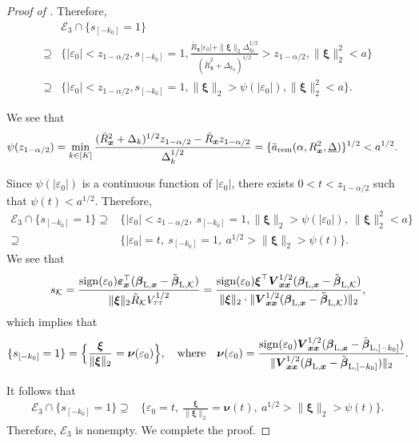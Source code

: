 \documentclass[12pt]{article}
\newcommand{\Lin}{\textnormal{L}}
\newcommand{\mk}{\mathcal{K}}
\newcommand{\rem}{\textnormal{rem}}
\newcommand{\bs}{\boldsymbol}
\begin{document}
\begin{proof}[Proof of ]
Therefore,
\begin{align*}
    & \mathcal{E}_3 \cap \{s_{[-k_0]}=1\} \\
   \supseteq &  \Big\{|\varepsilon_0| < z_{1-\alpha/2},s_{ [-k_0]}=1,\frac{\bar{R}_{\bs{x}}|\varepsilon_0|+\|\bs{\xi}\|_2 \Delta_{k_0}^{1/2} }{(\bar{R}_{\bs{x}}^2 + \Delta_{k_0})^{1/2}} > z_{1-\alpha/2}, \|\bs{\xi}\|_2^2 < a \Big\}\\
   \supseteq & \Big\{|\varepsilon_0| < z_{1-\alpha/2},s_{[-k_0]}=1, \|\bs{\xi}\|_2 >  \psi(|\varepsilon_0|),  \|\bs{\xi}\|_2^2 < a \Big\} .
\end{align*}

We see that
\begin{align*} 
    &\psi(z_{1-\alpha/2}) = \min_{k\in [K]} \frac{(\bar{R}_{\bs{x}}^2 + \Delta_{k})^{1/2}z_{1-\alpha/2}-\bar{R}_{\bs{x}}z_{1-\alpha/2}}{\Delta_{k}^{1/2}} = \{\bar{a}_{\rem}(\alpha, R^2_{ \bs{x}}, \underline{\Delta})\}^{1/2}  < a^{1/2}.
\end{align*}

Since $\psi(|\varepsilon_0|)$ is a continuous function of $|\varepsilon_0|$, there exists $0 < t < z_{1-\alpha/2}$ such that $\psi(t) < a^{1/2}$. Therefore, 
\begin{align*}
     \mathcal{E}_3 \cap \{s_{[-k_0]}=1\} \supseteq & \Big\{|\varepsilon_0| < z_{1-\alpha/2},~ s_{[-k_0]}=1, \|\bs{\xi}\|_2 >  \psi(|\varepsilon_0|),  ~ \|\bs{\xi}\|_2^2 < a \Big\} \\
    \supseteq & \Big\{|\varepsilon_0| = t ,~s_{[-k_0]}=1, ~ a^{1/2} > \|\bs{\xi}\|_2 >  \psi(t) \Big\}.
\end{align*}
We see that
\[
s_{\mk} = \frac{\operatorname{sign}(\varepsilon_{0})\bs{\varepsilon}_{\bs{x}}^\top (\bs{\beta}_{\Lin, \bs{x}}-\tilde{\bs{\beta}}_{\Lin,\mk})}{\|\bs{\xi}\|_2\tilde{R}_{\mk}V_{\tau\tau}^{1/2}} = \frac{\operatorname{sign}(\varepsilon_{0})\bs{\xi}^\top \bs{V}_{\bs{x}\bs{x}}^{1/2}(\bs{\beta}_{\Lin, \bs{x}}-\tilde{\bs{\beta}}_{\Lin,\mk})}{\|\bs{\xi}\|_2 \cdot\|\bs{V}_{\bs{x}\bs{x}}^{1/2}(\bs{\beta}_{\Lin, \bs{x}}-\tilde{\bs{\beta}}_{\Lin,\mk})\|_2},
\]
which implies that
\[
\{s_{[-k_0]} = 1\} = \Big\{ \frac{\bs{\xi}}{\|\bs{\xi}\|_2} = \bs{\nu}(\varepsilon_0) \Big\}, \quad \text{where}\quad \bs{\nu}(\varepsilon_0) = \frac{\operatorname{sign}(\varepsilon_{0}) \bs{V}_{\bs{x}\bs{x}}^{1/2}(\bs{\beta}_{\Lin, \bs{x}}-\tilde{\bs{\beta}}_{\Lin,[-k_0]})}{\|\bs{V}_{\bs{x}\bs{x}}^{1/2}(\bs{\beta}_{\Lin, \bs{x}}-\tilde{\bs{\beta}}_{\Lin,[-k_0]})\|_2}.
\]

It follows that
\begin{align*}
     \mathcal{E}_3 \cap \{s_{[-k_0]}=1\} \supseteq & \Big\{\varepsilon_0 =t,~ \frac{\bs{\xi}}{\|\bs{\xi}\|_2} = \bs{\nu}(t), ~ a^{1/2} > \|\bs{\xi}\|_2 >  \psi(t) \Big\}. 
\end{align*}
Therefore, $\mathcal{E}_3$ is  nonempty. We complete the proof. 
\end{proof}
\end{document}
